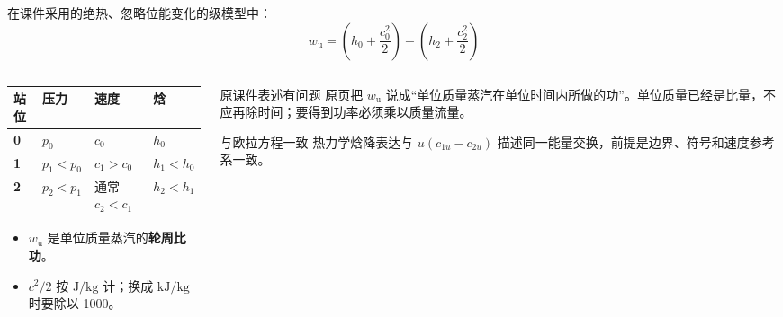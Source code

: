 \begin{frame}[t,shrink]{}
在课件采用的绝热、忽略位能变化的级模型中：
$$
w_{\mathrm{u}}
=\left(h_0+\frac{c_0^2}{2}\right)
-\left(h_2+\frac{c_2^2}{2}\right)
$$
\begin{columns}[T,onlytextwidth]
\begin{column}{0.49\textwidth}
  \begin{smalltab}
  \begin{tabularx}{\linewidth}{@{}>{\bfseries}p{13mm}XXX@{}}
    \toprule
    站位 & 压力 & 速度 & 焓\\
    \midrule
    0 & \(p_0\) & \(c_0\) & \(h_0\)\\
    1 & \(p_1<p_0\) & \(c_1>c_0\) & \(h_1<h_0\)\\
    2 & \(p_2<p_1\) & 通常 \(c_2<c_1\) & \(h_2<h_1\)\\
    \bottomrule
  \end{tabularx}
  \end{smalltab}
  \vspace{0.5mm}
  \begin{itemize}
    \item \(w_{\mathrm{u}}\) 是单位质量蒸汽的\textbf{轮周比功}。
    \item \(c^2/2\) 按 \(\mathrm{J/kg}\) 计；换成 \(\mathrm{kJ/kg}\) 时要除以 1000。
  \end{itemize}
\end{column}
\begin{column}{0.48\textwidth}
  \begin{amberbox}{原课件表述有问题}
  \small 原页把 \(w_{\mathrm{u}}\) 说成“单位质量蒸汽在单位时间内所做的功”。单位质量已经是比量，不应再除时间；要得到功率必须乘以质量流量。
  \end{amberbox}
  \vspace{0.7mm}
  \begin{keybox}{与欧拉方程一致}
  \small 热力学焓降表达与 \(u(c_{1u}-c_{2u})\) 描述同一能量交换，前提是边界、符号和速度参考系一致。
  \end{keybox}
\end{column}
\end{columns}
\end{frame}

